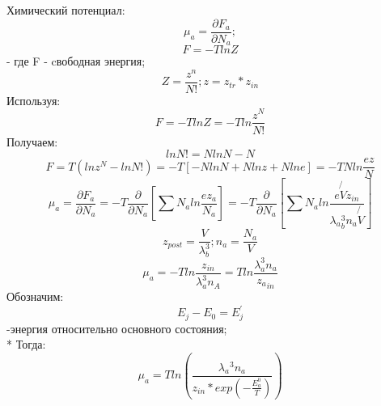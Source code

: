 \documentclass[letterpaper,12pt]{article}
\begin{document}
Химический потенциал:
\begin{equation} \label{eq:aperp} %
\mu_{a}=\frac{\partial F_{a}}{\partial N_{a}} ;
\end{equation}
\begin{equation} \label{eq:aperp} %
F= -Tln{Z} 
\end{equation}
- где F - cвободная энергия; 
\begin{equation} \label{eq:aperp} %
Z = \frac{z^n}{N!}; z = z_{tr}*z_{in} 
\end{equation}
Используя:
\begin{equation} \label{eq:aperp} %
F = -Tln{Z}=-Tln{\frac{z^N}{N!}} 
\end{equation}
Получаем:
\begin{equation} \label{eq:aperp} %
ln{N!}=NlnN-N 
\end{equation}
\begin{equation} \label{eq:aperp} %
F=T(ln{z^N} - ln{N!})=-T[-NlnN + Nlnz + Nln{e}]= - TNln{\frac{ez}{N}}
\end{equation}
 \begin{equation} \label{eq:aperp} %
\mu_{a}=\frac{\partial F_a}{\partial N_a}=-T \frac{\partial}{\partial N_a}[\sum N_a ln{\frac{ez_a}{N_a}}]=-T\frac{\partial}{\partial N_a}[\sum N_a ln{\frac{e \not{V} z_{in}}{\lambda{_a}^3_{b}n_a \not{V} }}] 
\end{equation}
\begin{equation} \label{eq:aperp} %
z_{post}=\frac{V}{\lambda^3_{b}}; n_a=\frac{N_a}{V} 
\end{equation}
\begin{equation} \label{eq:aperp} %
\mu_a=-T ln{\frac{z_{in}}{\lambda^3_a n_A}}= T ln{\frac{\lambda^3_a n_a}{z{_a}_{in}}} 
\end{equation}
Обозначим:
\begin{equation} \label{eq:aperp} %
E_{j}-E_{0}=E_{j}^{'}
\end{equation} -энергия относительно основного состояния;
\\*
Тогда:
\begin{equation} \label{eq:aperp} %
\mu_a = Tln(\frac{\lambda{_a}^3 n_a}{z_{in}*exp(- \frac{E_{a}^{0}}{T})})
\end{equation}
\end{document}

